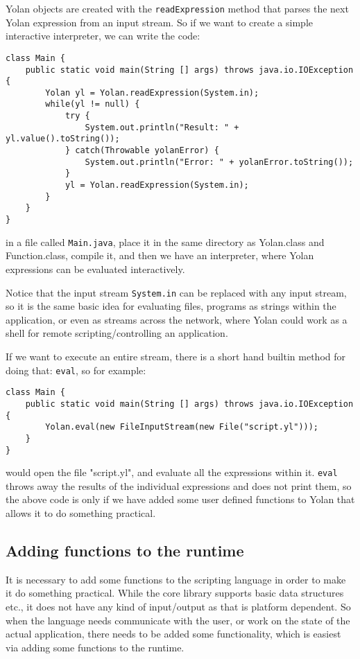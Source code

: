Yolan objects are created with the \verb|readExpression| method that parses the next Yolan expression from an input stream. So if we want to create a simple interactive interpreter, we can write the code:
{\scriptsize 
\begin{verbatim}
class Main {
    public static void main(String [] args) throws java.io.IOException {
        Yolan yl = Yolan.readExpression(System.in);
        while(yl != null) {
            try {
                System.out.println("Result: " + yl.value().toString());
            } catch(Throwable yolanError) {
                System.out.println("Error: " + yolanError.toString());
            }
            yl = Yolan.readExpression(System.in);
        }
    }
}
\end{verbatim} 
}
in a file called \verb|Main.java|, place it in the same directory as Yolan.class and Function.class, compile it, and then we have an interpreter, where Yolan expressions can be evaluated interactively.

Notice that the input stream \verb|System.in| can be replaced with any input stream, so it is the same basic idea for evaluating files, programs as strings within the application, or even as streams across the network, where Yolan could work as a shell for remote scripting/controlling an application.

If we want to execute an entire stream, there is a short hand builtin method for doing that: \verb|eval|, so for example:
{\scriptsize 
\begin{verbatim}
class Main {
    public static void main(String [] args) throws java.io.IOException {
        Yolan.eval(new FileInputStream(new File("script.yl")));
    }
}
\end{verbatim}
}
would open the file "script.yl", and evaluate all the expressions within it. 
\verb|eval| throws away the results of the individual expressions and does not print them,
so the above code is only if we have added some user defined functions to Yolan that allows it to do something practical.

\subsection{Adding functions to the runtime}
It is necessary to add some functions to the scripting language in order to make it do something practical. While the core library supports basic data structures etc., it does not have any kind of input/output as that is platform dependent.
So when the language needs communicate with the user, or work on the state of the actual application, there needs to be added some functionality, which is easiest via adding some functions to the runtime.

